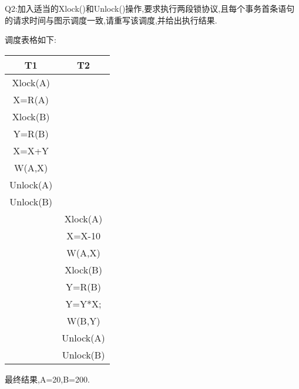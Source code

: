 Q2:加入适当的Xlock()和Unlock()操作,要求执行两段锁协议,且每个事务首条语句的请求时间与图示调度一致,请重写该调度,并给出执行结果.
\par 调度表格如下:
\begin{table}[H] 
    \centering
    \begin{tabular}{cc} %
        \toprule %
        T1 & T2  \\
        \midrule %
        Xlock(A) &  \\
        X=R(A) &  \\ 
        Xlock(B) & \\
        Y=R(B) & \\
        X=X+Y & \\
        W(A,X) & \\
        Unlock(A) & \\
        Unlock(B) & \\
        & Xlock(A) \\
        & X=X-10 \\
        & W(A,X) \\
        & Xlock(B) \\
        & Y=R(B) \\
        & Y=Y*X;\\
        & W(B,Y) \\
        & Unlock(A) \\
        & Unlock(B) \\
        \bottomrule %
    \end{tabular}
\end{table}
最终结果,A=20,B=200.